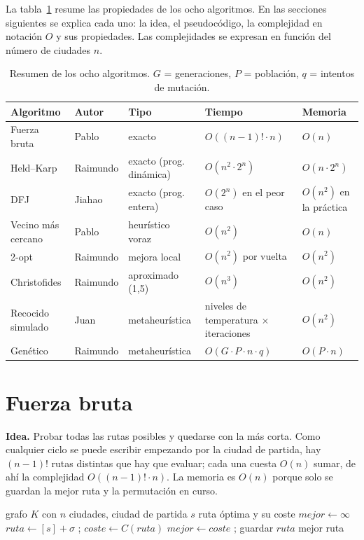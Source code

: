 La tabla~\ref{tab:fichas} resume las propiedades de los ocho algoritmos. En las secciones siguientes se explica cada uno: la idea, el pseudocódigo, la complejidad en notación $O$ y sus propiedades. Las complejidades se expresan en
función del número de ciudades $n$.

\begin{table}[htbp]
  \centering
  \caption{Resumen de los ocho algoritmos. $G$ = generaciones, $P$ = población, $q$ = intentos de mutación.}\label{tab:fichas}
  \footnotesize
  \begin{tabularx}{\linewidth}{@{}l l l X X@{}}
    \toprule
    Algoritmo & Autor & Tipo & Tiempo & Memoria \\
    \midrule
    Fuerza bruta & Pablo & exacto & $O((n-1)!\cdot n)$ & $O(n)$ \\
    Held--Karp & Raimundo & exacto (prog. dinámica) & $O(n^2\cdot 2^n)$ & $O(n\cdot 2^n)$ \\
    DFJ & Jiahao & exacto (prog. entera) & $O(2^n)$ en el peor caso & $O(n^2)$ en la práctica \\
    Vecino más cercano & Pablo & heurístico voraz & $O(n^2)$ & $O(n)$ \\
    2-opt & Raimundo & mejora local & $O(n^2)$ por vuelta & $O(n^2)$ \\
    Christofides & Raimundo & aproximado (1,5) & $O(n^3)$ & $O(n^2)$ \\
    Recocido simulado & Juan & metaheurística & niveles de temperatura $\times$ iteraciones & $O(n^2)$ \\
    Genético & Raimundo & metaheurística & $O(G\cdot P\cdot n\cdot q)$ & $O(P\cdot n)$ \\
    \bottomrule
  \end{tabularx}
\end{table}

\section{Fuerza bruta}\label{sec:fuerzabruta}

\textbf{Idea.} Probar todas las rutas posibles y quedarse con la más corta. Como cualquier ciclo se puede escribir empezando por la ciudad de partida, hay $(n-1)!$ rutas distintas que hay que evaluar; cada una cuesta $O(n)$ sumar,
de ahí la complejidad $O((n-1)!\cdot n)$. La memoria es $O(n)$ porque solo se guardan la mejor ruta y la permutación en curso.

\begin{algorithm}[htbp]
  \caption{Fuerza bruta}\label{alg:fb}
  \begin{algorithmic}[1]
    \Require grafo $K$ con $n$ ciudades, ciudad de partida $s$
    \Ensure ruta óptima y su coste
    \State $mejor \gets \infty$
      \State $ruta \gets [s]+\sigma$ \;;\; $coste \gets C(ruta)$ 
       \State $mejor \gets coste$ \;;\; guardar $ruta$ \EndIf
    \EndFor
    \State \Return mejor ruta
  \end{algorithmic}
\end{algorithm}

